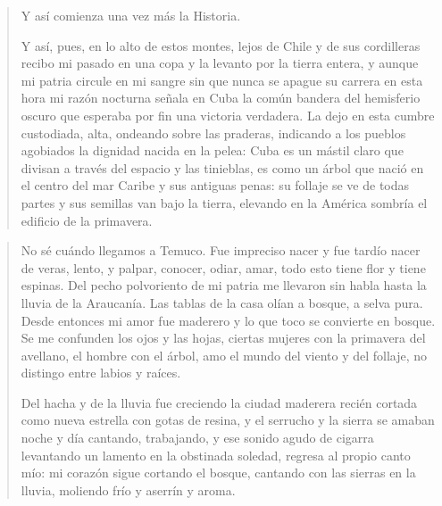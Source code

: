 \documentclass[12pt]{article}
\begin{document}
\begin{verse}
Y así comienza una vez más la Historia.  

Y así, pues, en lo alto de estos montes,  
lejos de Chile y de sus cordilleras  
recibo mi pasado en una copa  
y la levanto por la tierra entera,  
y aunque mi patria circule en mi sangre  
sin que nunca se apague su carrera  
en esta hora mi razón nocturna  
señala en Cuba la común bandera  
del hemisferio oscuro que esperaba  
por fin una victoria verdadera.  
La dejo en esta cumbre custodiada,  
alta, ondeando sobre las praderas,  
indicando a los pueblos agobiados  
la dignidad nacida en la pelea:  
Cuba es un mástil claro que divisan  
a través del espacio y las tinieblas,  
es como un árbol que nació en el centro  
del mar Caribe y sus antiguas penas:  
su follaje se ve de todas partes  
y sus semillas van bajo la tierra,  
elevando en la América sombría  
el edificio de la primavera.  

\end{verse}

\clearpage
{}
\begin{verse}
No sé cuándo llegamos a Temuco.  
Fue impreciso nacer y fue tardío  
nacer de veras, lento,  
y palpar, conocer, odiar, amar,  
todo esto tiene flor y tiene espinas.  
Del pecho polvoriento de mi patria  
me llevaron sin habla  
hasta la lluvia de la Araucanía.  
Las tablas de la casa  
olían a bosque,  
a selva pura.  
Desde entonces mi amor  
fue maderero  
y lo que toco se convierte en bosque.  
Se me confunden  
los ojos y las hojas,  
ciertas mujeres con la primavera  
del avellano, el hombre con el árbol,  
amo el mundo del viento y del follaje,  
no distingo entre labios y raíces.  

Del hacha y de la lluvia fue creciendo  
la ciudad maderera  
recién cortada como  
nueva estrella con gotas de resina,  
y el serrucho y la sierra  
se amaban noche y día  
cantando,  
trabajando,  
y ese sonido agudo de cigarra  
levantando un lamento  
en la obstinada soledad, regresa  
al propio canto mío:  
mi corazón sigue cortando el bosque,  
cantando con las sierras en la lluvia,  
moliendo frío y aserrín y aroma.  

\end{verse}
\end{document}
